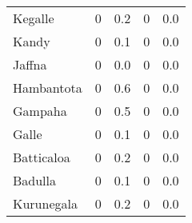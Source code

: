 \begin{tabular}{lrrrr}
Kegalle      &              0 &                 0.2 &              0 &                 0.0 \\
Kandy        &              0 &                 0.1 &              0 &                 0.0 \\
Jaffna       &              0 &                 0.0 &              0 &                 0.0 \\
Hambantota   &              0 &                 0.6 &              0 &                 0.0 \\
Gampaha      &              0 &                 0.5 &              0 &                 0.0 \\
Galle        &              0 &                 0.1 &              0 &                 0.0 \\
Batticaloa   &              0 &                 0.2 &              0 &                 0.0 \\
Badulla      &              0 &                 0.1 &              0 &                 0.0 \\
Kurunegala   &              0 &                 0.2 &              0 &                 0.0 \\
\bottomrule
\end{tabular}
